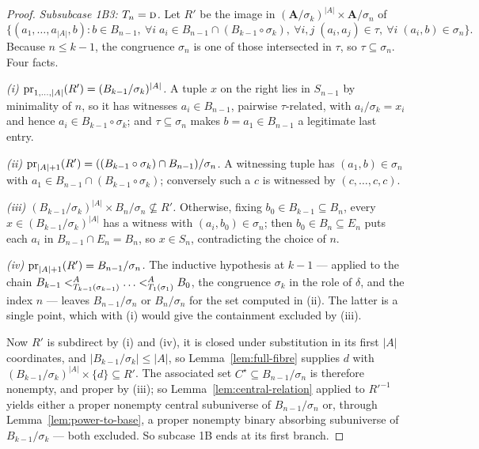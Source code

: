 \begin{proof}
\emph{Subsubcase 1B3: $T_{n}=\textup{\textsc{d}}$.} Let $R'$ be the image in
$(\mathbf A/\sigma_{k})^{|A|}\times\mathbf A/\sigma_{n}$ of
\[
  \bigl\{(a_{1},\dots,a_{|A|},b):b\in B_{n-1},\ \forall i\;
    a_{i}\in B_{n-1}\cap(B_{k-1}\circ\sigma_{k}),\ \forall i,j\;
    (a_{i},a_{j})\in\tau,\ \forall i\;(a_{i},b)\in\sigma_{n}\bigr\} .
\]
Because $n\le k-1$, the congruence $\sigma_{n}$ is one of those intersected in
$\tau$, so $\tau\subseteq\sigma_{n}$. Four facts.

\emph{(i) $\operatorname*{pr}_{1,\dots,|A|}(R')=(B_{k-1}/\sigma_{k})^{|A|}$.} A tuple
$x$ on the right lies in $S_{n-1}$ by minimality of $n$, so it has witnesses
$a_{i}\in B_{n-1}$, pairwise $\tau$-related, with $a_{i}/\sigma_{k}=x_{i}$ and
hence $a_{i}\in B_{k-1}\circ\sigma_{k}$; and $\tau\subseteq\sigma_{n}$ makes
$b=a_{1}\in B_{n-1}$ a legitimate last entry.

\emph{(ii) $\operatorname*{pr}_{|A|+1}(R')=((B_{k-1}\circ\sigma_{k})\cap B_{n-1})/\sigma_{n}$.}
A witnessing tuple has $(a_{1},b)\in\sigma_{n}$ with
$a_{1}\in B_{n-1}\cap(B_{k-1}\circ\sigma_{k})$; conversely such a $c$ is
witnessed by $(c,\dots,c,c)$.

\emph{(iii) $(B_{k-1}/\sigma_{k})^{|A|}\times B_{n}/\sigma_{n}\not\subseteq R'$.}
Otherwise, fixing $b_{0}\in B_{k-1}\subseteq B_{n}$, every
$x\in(B_{k-1}/\sigma_{k})^{|A|}$ has a witness with $(a_{i},b_{0})\in
\sigma_{n}$; then $b_{0}\in B_{n}\subseteq E_{n}$ puts each $a_{i}$ in
$B_{n-1}\cap E_{n}=B_{n}$, so $x\in S_{n}$, contradicting the choice of $n$.

\emph{(iv) $\operatorname*{pr}_{|A|+1}(R')=B_{n-1}/\sigma_{n}$.} The inductive hypothesis at
$k-1$ --- applied to the chain $B_{k-1}\subt[A]{T_{k-1}(\sigma_{k-1})}\dots
\subt[A]{T_{1}(\sigma_{1})}B_{0}$, the congruence $\sigma_{k}$ in the role of
$\delta$, and the index $n$ --- leaves $B_{n-1}/\sigma_{n}$ or
$B_{n}/\sigma_{n}$ for the set computed in (ii). The latter is a single point,
which with (i) would give the containment excluded by (iii).

Now $R'$ is subdirect by (i) and (iv), it is closed under substitution in its
first $|A|$ coordinates, and $|B_{k-1}/\sigma_{k}|\le|A|$, so
Lemma~\ref{lem:full-fibre} supplies $d$ with
$(B_{k-1}/\sigma_{k})^{|A|}\times\{d\}\subseteq R'$. The associated set
$C^{\star}\subseteq B_{n-1}/\sigma_{n}$ is therefore nonempty, and proper by
(iii); so Lemma~\ref{lem:central-relation} applied to $R'^{-1}$ yields either a
proper nonempty central subuniverse of $B_{n-1}/\sigma_{n}$ or, through
Lemma~\ref{lem:power-to-base}, a proper nonempty binary absorbing subuniverse
of $B_{k-1}/\sigma_{k}$ --- both excluded. So subcase 1B ends at its first
branch.


\end{proof}
